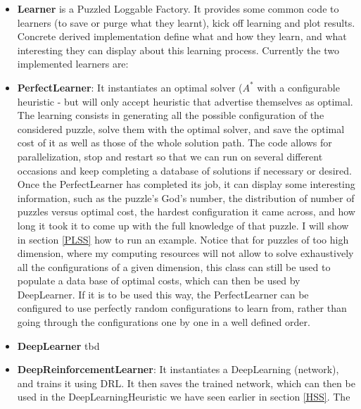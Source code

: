 \begin{itemize}
\item \textbf{Learner} is a Puzzled Loggable Factory. It provides some common code to learners (to save or purge what they learnt), kick off learning and plot results. Concrete derived implementation define what and how they learn, and what interesting they can display about this learning process. Currently the two implemented learners are:
\item \textbf{PerfectLearner}: It instantiates an optimal solver ($A^{*}$ with a configurable heuristic - but will only accept heuristic that advertise themselves as optimal. The learning consists in generating all the possible configuration of the considered puzzle, solve them with the optimal solver, and save the optimal cost of it as well as those of the whole solution path. The code allows for parallelization, stop and restart so that we can run on several different occasions and keep completing a database of solutions if necessary or desired. Once the PerfectLearner has completed its job, it can display some interesting information, such as the puzzle's God's number, the distribution of number of puzzles versus optimal cost, the hardest configuration it came across, and how long it took it to come up with the full knowledge of that puzzle. I will show in section \ref{PLSS} how to run an example. Notice that for puzzles of too high dimension, where my computing resources will not allow to solve exhaustively all the configurations of a given dimension, this class can still be used to populate a data base of optimal costs, which can then be used by DeepLearner. If it is to be used this way, the PerfectLearner can be configured to use perfectly random configurations to learn from, rather than going through the configurations one by one in a well defined order.

\item \textbf{DeepLearner} tbd
\item \textbf{DeepReinforcementLearner}: It instantiates a DeepLearning (network), and trains it using DRL. It then saves the trained network, which can then be used in the DeepLearningHeuristic we have seen earlier in section \ref{HSS}. The


\end{itemize}


